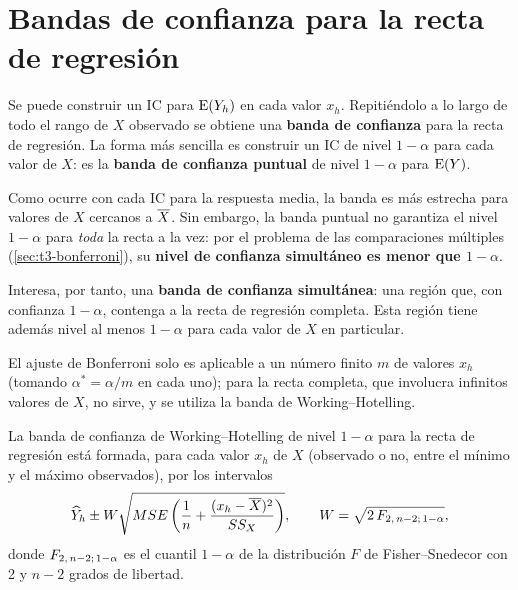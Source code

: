 \section{Bandas de confianza para la recta de regresión}
\label{sec:t3-bandas}

Se puede construir un IC para $\operatorname{E}(Y_h)$ en cada valor $x_h$. Repitiéndolo a lo largo de todo el
rango de $X$ observado se obtiene una \textbf{banda de confianza} para la recta de regresión. La
forma más sencilla es construir un IC de nivel $1-\alpha$ para cada valor de $X$: es la
\textbf{banda de confianza puntual} de nivel $1-\alpha$ para $\operatorname{E}(Y)$.

Como ocurre con cada IC para la respuesta media, la banda es más estrecha para valores de $X$
cercanos a $\overline{X}$. Sin embargo, la banda puntual no garantiza el nivel $1-\alpha$ para
\emph{toda} la recta a la vez: por el problema de las comparaciones múltiples
(\cref{sec:t3-bonferroni}), su \textbf{nivel de confianza simultáneo es menor que $1-\alpha$}.

Interesa, por tanto, una \textbf{banda de confianza simultánea}: una región que, con confianza
$1-\alpha$, contenga a la recta de regresión completa. Esta región tiene además nivel al menos
$1-\alpha$ para cada valor de $X$ en particular.

El ajuste de Bonferroni solo es aplicable a un número finito $m$ de valores $x_h$ (tomando
$\alpha^*=\alpha/m$ en cada uno); para la recta completa, que involucra infinitos valores de $X$,
no sirve, y se utiliza la banda de Working--Hotelling.

\begin{definicion}
  La banda de confianza de Working--Hotelling de nivel $1-\alpha$ para la recta de regresión
  está formada, para cada valor $x_h$ de $X$ (observado o no, entre el mínimo y el máximo
  observados), por los intervalos
  \[
    \widehat{Y}_h \pm W\sqrt{MSE\left(\frac1n+\frac{(x_h-\overline{X})^2}{SS_X}\right)},
    \qquad
    W=\sqrt{2\,F_{2,\,n-2;\,1-\alpha}},
  \]
  donde $F_{2,\,n-2;\,1-\alpha}$ es el cuantil $1-\alpha$ de la distribución $F$ de
  Fisher--Snedecor con 2 y $n-2$ grados de libertad.
\end{definicion}

